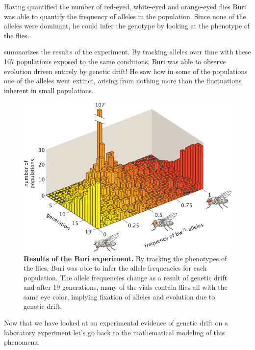 Having quantified the number of red-eyed, white-eyed and orange-eyed flies Buri
was able to quantify the frequency of alleles in the population. Since none of
the alleles were dominant, he could infer the genotype  by looking at the
phenotype of the flies.

 summarizes the results of the experiment. By
tracking alleles over time with these 107 populations exposed to the same
conditions, Buri was able to observe evolution driven entirely by genetic
drift! He saw how in some of the populations one of the alleles went extinct,
arising from nothing more than the fluctuations inherent in small populations.

\begin{figure}[h!]
\centering
\includegraphics[scale=0.85]
  {../fig/drift_langevin/02_01_03_buri_experiment.png}
  \caption{\textbf{Results of the Buri experiment.} By tracking the phenotypes
  of the  flies, Buri was able to infer the allele frequencies for each
  population. The allele frequencies change as a result of genetic drift and
  after 19 generations, many of the vials contain flies all with the same eye
  color, implying fixation of alleles and evolution due to genetic drift.}
  \label{fig_buri_experiment}
\end{figure}

Now that we have looked at an experimental evidence of genetic drift on a
laboratory experiment let's go back to the mathematical modeling of this
phenomena.